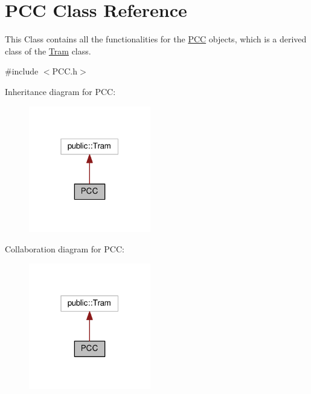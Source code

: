 \hypertarget{classPCC}{}\section{P\+CC Class Reference}
\label{classPCC}


This Class contains all the functionalities for the \hyperlink{classPCC}{P\+CC} objects, which is a derived class of the \hyperlink{classTram}{Tram} class.  




{\ttfamily \#include $<$P\+C\+C.\+h$>$}



Inheritance diagram for P\+CC\+:\nopagebreak
\begin{figure}[H]
\begin{center}
\leavevmode
\includegraphics[width=151pt]{classPCC__inherit__graph}
\end{center}
\end{figure}


Collaboration diagram for P\+CC\+:\nopagebreak
\begin{figure}[H]
\begin{center}
\leavevmode
\includegraphics[width=151pt]{classPCC__coll__graph}
\end{center}
\end{figure}
